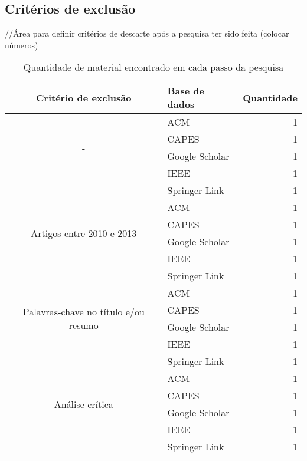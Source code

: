 		\subsection{Critérios de exclusão}
			//Área para definir critérios de descarte após a pesquisa ter sido feita (colocar números)
			\begin{table}[H]
				\centering
				\begin{tabular}{| c | l | r |} \hline \textbf{Critério de exclusão} & \textbf{Base de dados}  & \textbf{Quantidade} \\ \hline
					\multirow{4}{*}{-}
						& ACM & 1 \\ \cline{2-3}
						& CAPES & 1 \\ \cline{2-3}
						& Google Scholar & 1 \\ \cline{2-3}
						& IEEE & 1 \\ \cline{2-3}
						& Springer Link & 1 \\ \cline{2-3}
					\hline \hline
					\multirow{4}{*}{Artigos entre 2010 e 2013} 
						& ACM & 1 \\ \cline{2-3}
						& CAPES & 1 \\ \cline{2-3}
						& Google Scholar & 1 \\ \cline{2-3}
						& IEEE & 1 \\ \cline{2-3}
						& Springer Link & 1 \\ \cline{2-3}
					\hline \hline
					\multirow{4}{*}{Palavras-chave no título e/ou resumo} 
						& ACM & 1 \\ \cline{2-3}
						& CAPES & 1 \\ \cline{2-3}
						& Google Scholar & 1 \\ \cline{2-3}
						& IEEE & 1 \\ \cline{2-3}
						& Springer Link & 1 \\ \cline{2-3}
					\hline \hline
					\multirow{4}{*}{Análise crítica}
						& ACM & 1 \\ \cline{2-3}
						& CAPES & 1 \\ \cline{2-3}
						& Google Scholar & 1 \\ \cline{2-3}
						& IEEE & 1 \\ \cline{2-3}
						& Springer Link & 1 \\ \cline{2-3}
					\hline
				\end{tabular}
				\caption{Quantidade de material encontrado em cada passo da pesquisa}
				\label{tab:quantidadeDeMateriais}
			\end{table}
